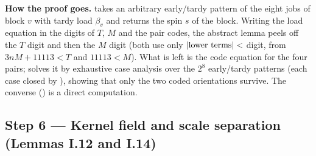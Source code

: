 \documentclass[11pt]{article}
\begin{document}
\textbf{How the proof goes.}  takes an arbitrary early/tardy pattern
 of the eight jobs of block $v$ with tardy load $\beta_v$ and returns the spin
$s$ of the block. Writing the load equation in the digits of $T$, $M$ and the pair codes, the
abstract lemma  peels off the $T$ digit and then the $M$ digit (both use only
$|{\rm lower\ terms}|<$ digit, from $3nM+11113<T$ and $11113<M$). What is left is the code
equation for the four pairs;  solves it by exhaustive case analysis over the
$2^8$ early/tardy patterns (each case closed by ), showing that only the two coded
orientations survive. The converse () is a direct computation.

\subsection{Step 6 --- Kernel field and scale separation (Lemmas I.12 and I.14)}\label{step:sep}
\end{document}
